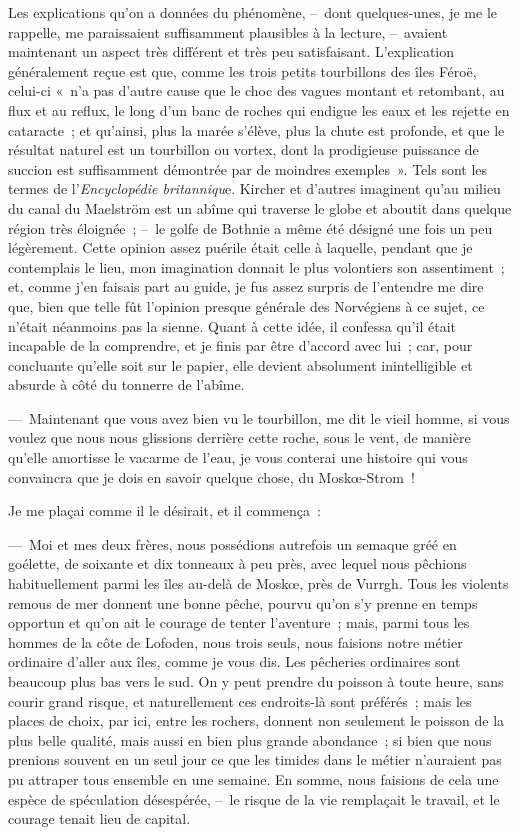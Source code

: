 \documentclass[french,twoside]{book} %
\begin{document}
Les explications qu’on a données du phénomène, – dont quelques-unes, je me le rappelle, me paraissaient suffisamment plausibles à la lecture, – avaient maintenant un aspect très différent et très peu satisfaisant. L’explication généralement reçue est que, comme les trois petits tourbillons des îles Féroë, celui-ci « n’a pas d’autre cause que le choc des vagues montant et retombant, au flux et au reflux, le long d’un banc de roches qui endigue les eaux et les rejette en cataracte ; et qu’ainsi, plus la marée s’élève, plus la chute est profonde, et que le résultat naturel est un tourbillon ou vortex, dont la prodigieuse puissance de succion est suffisamment démontrée par de moindres exemples ». Tels sont les termes de l’\emph{Encyclopédie britanniqu}e. Kircher et d’autres imaginent qu’au milieu du canal du Maelström est un abîme qui traverse le globe et aboutit dans quelque région très éloignée ; – le golfe de Bothnie a même été désigné une fois un peu légèrement. Cette opinion assez puérile était celle à laquelle, pendant que je contemplais le lieu, mon imagination donnait le plus volontiers son assentiment ; et, comme j’en faisais part au guide, je fus assez surpris de l’entendre me dire que, bien que telle fût l’opinion presque générale des Norvégiens à ce sujet, ce n’était néanmoins pas la sienne. Quant à cette idée, il confessa qu’il était incapable de la comprendre, et je finis par être d’accord avec lui ; car, pour concluante qu’elle soit sur le papier, elle devient absolument inintelligible et absurde à côté du tonnerre de l’abîme.\par
— Maintenant que vous avez bien vu le tourbillon, me dit le vieil homme, si vous voulez que nous nous glissions derrière cette roche, sous le vent, de manière qu’elle amortisse le vacarme de l’eau, je vous conterai une histoire qui vous convaincra que je dois en savoir quelque chose, du Moskœ-Strom !\par
Je me plaçai comme il le désirait, et il commença :\par
— Moi et mes deux frères, nous possédions autrefois un semaque gréé en goélette, de soixante et dix tonneaux à peu près, avec lequel nous pêchions habituellement parmi les îles au-delà de Moskœ, près de Vurrgh. Tous les violents remous de mer donnent une bonne pêche, pourvu qu’on s’y prenne en temps opportun et qu’on ait le courage de tenter l’aventure ; mais, parmi tous les hommes de la côte de Lofoden, nous trois seuls, nous faisions notre métier ordinaire d’aller aux îles, comme je vous dis. Les pêcheries ordinaires sont beaucoup plus bas vers le sud. On y peut prendre du poisson à toute heure, sans courir grand risque, et naturellement ces endroits-là sont préférés ; mais les places de choix, par ici, entre les rochers, donnent non seulement le poisson de la plus belle qualité, mais aussi en bien plus grande abondance ; si bien que nous prenions souvent en un seul jour ce que les timides dans le métier n’auraient pas pu attraper tous ensemble en une semaine. En somme, nous faisions de cela une espèce de spéculation désespérée, – le risque de la vie remplaçait le travail, et le courage tenait lieu de capital.\par
\end{document}
